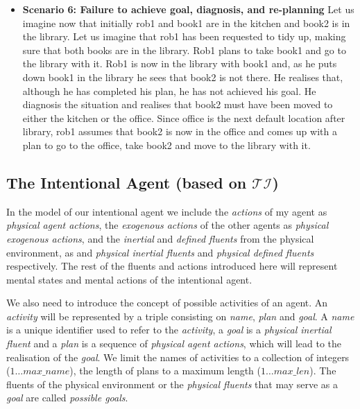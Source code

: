 \documentclass[11pt, oneside]{article}
\begin{document}
\begin{itemize}
\item \textbf{Scenario 6: Failure to achieve goal, diagnosis, and re-planning}\newline
Let us imagine now that initially rob1 and book1 are in the kitchen and book2 is in the library. Let us imagine that rob1 has been requested to tidy up, making sure that both books are in the library. Rob1 plans to take book1 and go to the library with it. Rob1 is now in the library with book1 and, as he puts down book1 in the library he sees that book2 is not there. He realises that, although he has completed his plan, he has not achieved his goal. He diagnosis the situation and realises that book2 must have been moved to either the kitchen or the office. Since office is the next default location after library, rob1 assumes that book2 is now in the office and comes up with a plan to go to the office, take book2 and move to the library with it.  
\end{itemize}




\subsection{The Intentional Agent (based on $\mathcal{TI}$) }
In the model of our intentional agent we include the \emph{actions} of my agent as \emph{physical  agent  actions},  the \emph{exogenous actions} of the other agents as \emph{physical exogenous actions}, and the \emph{inertial} and \emph{defined fluents} from the physical environment, as  and \emph{physical  inertial  fluents} and \emph{physical defined fluents} respectively. The rest of the fluents and actions introduced here will represent mental states and mental actions of the intentional agent. 

We also need to introduce the concept of possible activities of an agent. An \emph{activity} will be represented by a triple consisting on \emph{name}, \emph{plan} and \emph{goal}. A \emph{name} is a unique identifier used to refer to the \emph{activity}, a \emph{goal} is a \emph{physical inertial  fluent} and a \emph{plan} is a sequence of \emph{physical agent  actions}, which will lead to the realisation of the \emph{goal}.  We limit the names of activities to a collection of integers ($1\dots max\_name$), the length of plans to a maximum length ($1\dots max\_len$). The fluents of the physical environment  or the \emph{physical fluents} that may serve as a \emph{goal} are called \emph{possible  goals}. 
\end{document}
